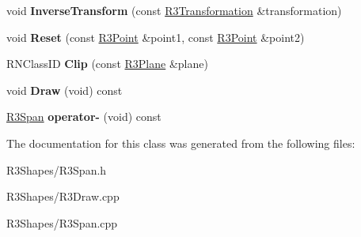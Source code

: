 \begin{DoxyCompactItemize}
\item 
void {\bfseries Inverse\+Transform} (const \hyperlink{class_r3_transformation}{R3\+Transformation} \&transformation)\hypertarget{class_r3_span_add3ed3a5f7458b7328634b7929f82dca}{}\label{class_r3_span_add3ed3a5f7458b7328634b7929f82dca}

\item 
void {\bfseries Reset} (const \hyperlink{class_r3_point}{R3\+Point} \&point1, const \hyperlink{class_r3_point}{R3\+Point} \&point2)\hypertarget{class_r3_span_a64b035877a24244951eb700f1e55c022}{}\label{class_r3_span_a64b035877a24244951eb700f1e55c022}

\item 
R\+N\+Class\+ID {\bfseries Clip} (const \hyperlink{class_r3_plane}{R3\+Plane} \&plane)\hypertarget{class_r3_span_a90c362a1cfea5b2053cdb0cf3c624216}{}\label{class_r3_span_a90c362a1cfea5b2053cdb0cf3c624216}

\item 
void {\bfseries Draw} (void) const \hypertarget{class_r3_span_ab72e55af15ad8a4c5f17d9e9b3a4b06e}{}\label{class_r3_span_ab72e55af15ad8a4c5f17d9e9b3a4b06e}

\item 
\hyperlink{class_r3_span}{R3\+Span} {\bfseries operator-\/} (void) const \hypertarget{class_r3_span_a193206788b9e14243c72f71ffff95b4a}{}\label{class_r3_span_a193206788b9e14243c72f71ffff95b4a}

\end{DoxyCompactItemize}


The documentation for this class was generated from the following files\+:\begin{DoxyCompactItemize}
\item 
R3\+Shapes/R3\+Span.\+h\item 
R3\+Shapes/R3\+Draw.\+cpp\item 
R3\+Shapes/R3\+Span.\+cpp\end{DoxyCompactItemize}
